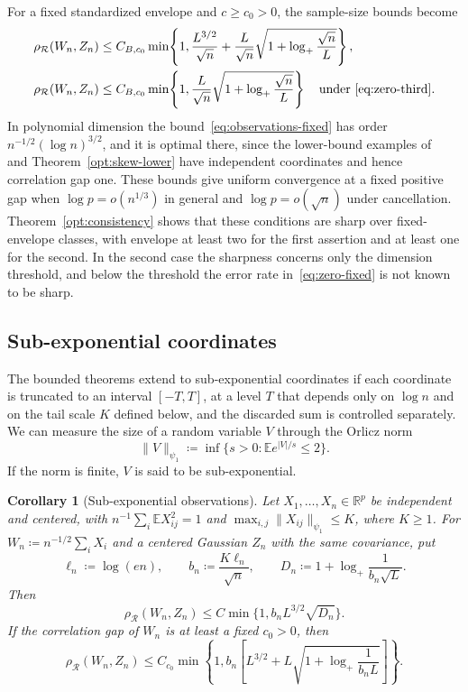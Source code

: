\documentclass[11pt,letterpaper]{article}
\newtheorem{corollary}{Corollary}
\theoremstyle{remark}
\newcommand{\E}{\mathbb E}
\newcommand{\R}{\mathbb R}
\newcommand{\rh}{\rho_{\mathcal R}}
\begin{document}
For a fixed standardized envelope and \(c\ge c_0>0\), the sample-size
bounds become
\begin{align}
 \rh(W_n,Z_n)&\le C_{B,c_0}\min\!\left\{1,
 \frac{L^{3/2}}{\sqrt n}
 +\frac L{\sqrt n}\sqrt{1+\log_+\frac{\sqrt n}{L}}\right\},
 \label{eq:observations-fixed}\\
 \rh(W_n,Z_n)&\le C_{B,c_0}\min\!\left\{1,
 \frac L{\sqrt n}\sqrt{1+\log_+\frac{\sqrt n}{L}}\right\}
 \quad\text{under~\eqref{eq:zero-third}}.
 \label{eq:zero-fixed}
\end{align}
In polynomial dimension the bound~\eqref{eq:observations-fixed}
has order \(n^{-1/2}(\log n)^{3/2}\), and it is optimal there, since the
lower-bound examples of~\cite[Proposition~2.1]{CCK} and
Theorem~\ref{opt:skew-lower} have independent coordinates and hence
correlation gap one. These bounds give uniform convergence at a fixed
positive gap when \(\log p=o(n^{1/3})\) in general and \(\log p=o(\sqrt n)\)
under cancellation. Theorem~\ref{opt:consistency} shows that these
conditions are sharp over fixed-envelope classes, with envelope at least
two for the first assertion and at least one for the second. In
the second case the sharpness concerns only the dimension threshold, and
below the threshold the error rate in~\eqref{eq:zero-fixed} is not known
to be sharp.

\subsection{Sub-exponential coordinates}\label{sec:subexponential}
The bounded theorems extend to sub-exponential coordinates if each
coordinate is truncated to an interval \([-T,T]\), at a
level \(T\) that depends only on \(\log n\) and on the tail scale \(K\) defined below, and the discarded sum is
controlled separately. We can measure the size of a random variable \(V\) through
the Orlicz norm
\[
 \|V\|_{\psi_1}\coloneqq \inf\{s>0:\E e^{|V|/s}\le2\}.
\]
If the norm is finite, \(V\) is said to be sub-exponential.

\begin{corollary}[Sub-exponential observations]\label{cor:subexponential}
Let \(X_1,\ldots,X_n\in\R^p\) be independent and centered, with
\(n^{-1}\sum_i\E X_{ij}^2=1\) and
\(\max_{i,j}\|X_{ij}\|_{\psi_1}\le K\), where \(K\ge1\).
For \(W_n\coloneqq n^{-1/2}\sum_iX_i\) and a centered Gaussian \(Z_n\)
with the same covariance, put
\[
 \ell_n\coloneqq \log(en),\qquad b_n\coloneqq \frac{K\ell_n}{\sqrt n},\qquad
 D_n\coloneqq 1+\log_+\frac1{b_n\sqrt L}.
\]
Then
\begin{equation}
 \rh(W_n,Z_n)\le C\min\{1,b_nL^{3/2}\sqrt{D_n}\}.
 \label{eq:subexponential}
\end{equation}
If the correlation gap of \(W_n\) is at least a fixed \(c_0>0\), then
\begin{equation}
 \rh(W_n,Z_n)\le C_{c_0}\min\!\left\{1,
 b_n\left[L^{3/2}+L\sqrt{1+\log_+\frac1{b_nL}}\right]\right\}.
 \label{eq:subexponential-gap}
\end{equation}
\end{corollary}
\end{document}

